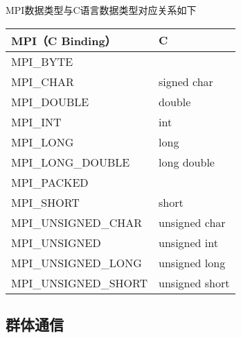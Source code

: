 \documentclass{article}
\begin{document}
					MPI数据类型与C语言数据类型对应关系如下
					\begin{table}
						\centering
						\begin{tabular}{ll}
							\hline
							MPI（C Binding） & C \\
							\hline
							MPI\_BYTE & \\
							MPI\_CHAR & signed char\\
							MPI\_DOUBLE & double\\
							MPI\_INT & int\\
							MPI\_LONG & long\\
							MPI\_LONG\_DOUBLE & long double\\
							MPI\_PACKED & \\
							MPI\_SHORT & short\\
							MPI\_UNSIGNED\_CHAR & unsigned char\\
							MPI\_UNSIGNED & unsigned int\\
							MPI\_UNSIGNED\_LONG & unsigned long\\
							MPI\_UNSIGNED\_SHORT & unsigned short\\
							\hline
						\end{tabular}
					\end{table}
				\subsection{群体通信}
				
\end{document}
